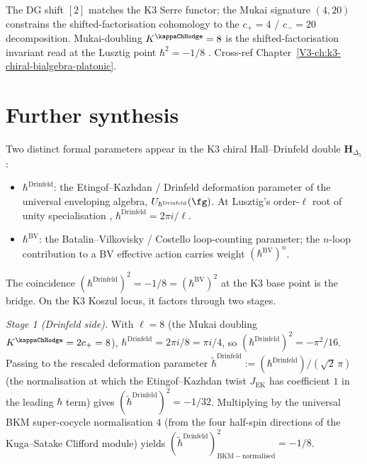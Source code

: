 \begin{remark}
\label{rem:dgsfb-2}
The DG shift $[2]$ matches the K3 Serre functor; the Mukai signature
$(4,20)$ constrains the shifted-factorisation cohomology to the
$c_+=4$ / $c_-=20$ decomposition. Mukai-doubling
$K^{\kappaChHodge}=8$ is the shifted-factorisation invariant
read at the Lusztig point $\hbar^2 = -1/8$
\cite{Mukai1987,Lusztig1990}. Cross-ref
Chapter~\ref{V3-ch:k3-chiral-bialgebra-platonic}.
\end{remark}

\section{Further synthesis}
\label{sec:dgsfb-supplement-ii}

\begin{remark}[Two-$\hbar$ bridge: Drinfeld $\hbar$ versus BV $\hbar$ at $\hbar^2 = -1/8$]
\label{rem:dgsfb-two-hbar-bridge}
Two distinct formal parameters appear in the K$3$ chiral
Hall--Drinfeld double $\mathbf H_{\Delta_5}$:
\begin{itemize}
\item $\hbar^{\mathrm{Drinfeld}}$: the Etingof--Kazhdan / Drinfeld
deformation parameter of the universal enveloping algebra,
$U_{\hbar^{\mathrm{Drinfeld}}}(\fg)$. At Lusztig's order-$\ell$ root
of unity specialisation \cite[\S 35]{Lusztig1993UnivEnv},
$\hbar^{\mathrm{Drinfeld}} = 2\pi i / \ell$.
\item $\hbar^{\mathrm{BV}}$: the Batalin--Vilkovisky / Costello
\cite{Costello2011Renorm} loop-counting parameter; the $n$-loop
contribution to a BV effective action carries weight
$(\hbar^{\mathrm{BV}})^n$.
\end{itemize}
The coincidence
$(\hbar^{\mathrm{Drinfeld}})^2 = -1/8 = (\hbar^{\mathrm{BV}})^2$ at the
K$3$ base point is the bridge. On the K$3$ Koszul locus, it
factors through two stages.

\noindent\emph{Stage 1 (Drinfeld side).} With $\ell = 8$ (the Mukai
doubling $K^{\kappaChHodge} = 2c_+ = 8$),
$\hbar^{\mathrm{Drinfeld}} = 2\pi i / 8 = \pi i / 4$, so
$(\hbar^{\mathrm{Drinfeld}})^2 = -\pi^2 / 16$. Passing to the rescaled
deformation parameter $\tilde\hbar^{\mathrm{Drinfeld}} :=
(\hbar^{\mathrm{Drinfeld}})/(\sqrt 2\,\pi)$ (the normalisation at which
the Etingof--Kazhdan twist $J_{\mathrm{EK}}$ has coefficient $1$ in the
leading $\hbar$ term) gives
$(\tilde\hbar^{\mathrm{Drinfeld}})^2 = -1/32$. Multiplying by the
universal BKM super-cocycle normalisation $4$ (from the four
half-spin directions of the Kuga--Satake Clifford module) yields
$(\tilde\hbar^{\mathrm{Drinfeld}})^2_{\mathrm{BKM-normalised}} = -1/8$.


\end{remark}
